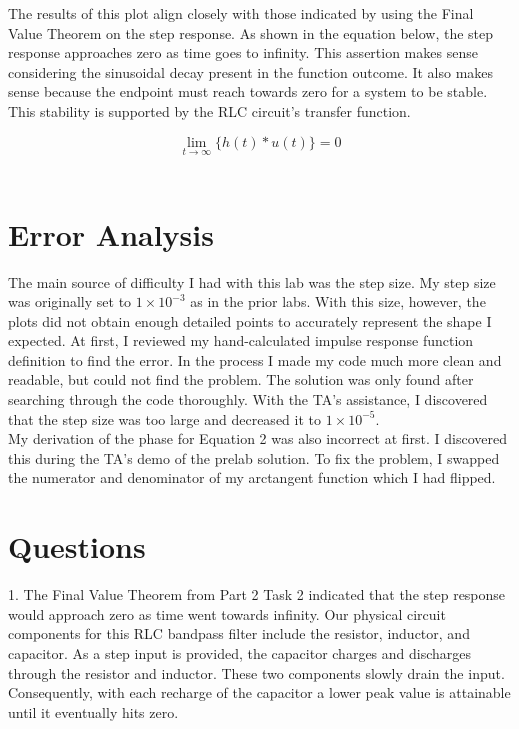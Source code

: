 \documentclass[12pt]{report}
\begin{document}
The results of this plot align closely with those indicated by using the Final Value Theorem on the step response. As shown in the equation below, the step response approaches zero as time goes to infinity. This assertion makes sense considering the sinusoidal decay present in the function outcome. It also makes sense because the endpoint must reach towards zero for a system to be stable. This stability is supported by the RLC circuit's transfer function.

\begin{equation*}
	\lim_{t\rightarrow \infty}\{h(t) * u(t)\} = 0
\end{equation*} \\
	
\section{Error Analysis}
	
The main source of difficulty I had with this lab was the step size. My step size was originally set to $ 1 \times 10^{-3} $ as in the prior labs. With this size, however, the plots did not obtain enough detailed points to accurately represent the shape I expected. At first, I reviewed my hand-calculated impulse response function definition to find the error. In the process I made my code much more clean and readable, but could not find the problem. The solution was only found after searching through the code thoroughly. With the TA's assistance, I discovered that the step size was too large and decreased it to $ 1 \times 10^{-5} $. \\  

My derivation of the phase for Equation 2 was also incorrect at first. I discovered this during the TA's demo of the prelab solution. To fix the problem, I swapped the numerator and denominator of my arctangent function which I had flipped. \\
	
\section{Questions}

1. The Final Value Theorem from Part 2 Task 2 indicated that the step response would approach zero as time went towards infinity. Our physical circuit components for this RLC bandpass filter include the resistor, inductor, and capacitor. As a step input is provided, the capacitor charges and discharges through the resistor and inductor. These two components slowly drain the input. Consequently, with each recharge of the capacitor a lower peak value is attainable until it eventually hits zero. \\
\end{document}
